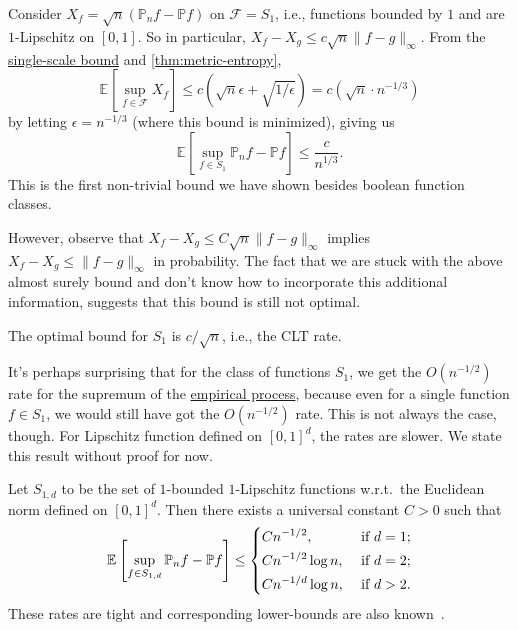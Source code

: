 \begin{eg}\label{eg:non-optimal-EP-supremum-S1}
	Consider \(X_f = \sqrt{n} (\mathbb{P} _n f - \mathbb{P} f)\) on \(\mathscr{F} = S_1\), i.e., functions bounded by \(1\) and are \(1\)-Lipschitz on \([0, 1]\). So in particular, \(X_f - X_g \leq c \sqrt{n} \lVert f - g \rVert _\infty\). From the \hyperref[lma:single-scale-bound]{single-scale bound} and \autoref{thm:metric-entropy},
	\[
		\mathbb{E}_{}\left[\sup _{f\in \mathscr{F} } X_f \right]
		\leq c \left(\sqrt{n} \epsilon + \sqrt{1 / \epsilon } \right)
		= c(\sqrt{n} \cdot n^{-1 / 3})
	\]
	by letting \(\epsilon = n^{-1 / 3}\) (where this bound is minimized), giving us
	\[
		\mathbb{E}_{}\left[\sup _{f\in S_1}\mathbb{P} _n f - \mathbb{P} f \right] \leq \frac{c}{n^{1 / 3}}.
	\]
	This is the first non-trivial bound we have shown besides boolean function classes.

	However, observe that \(X_f - X_g \leq C \sqrt{n} \lVert f - g \rVert _\infty \) implies \(X_f - X_g \leq \lVert f - g \rVert _\infty \) in probability. The fact that we are stuck with the above almost surely bound and don't know how to incorporate this additional information, suggests that this bound is still not optimal.
	\begin{remark}
		The optimal bound for \(S_1\) is \(c / \sqrt{n} \), i.e., the CLT rate.
	\end{remark}
\end{eg}

It's perhaps surprising that for the class of functions \(S_1\), we get the \(O(n^{-1 / 2})\) rate for the supremum of the \hyperref[def:EP]{empirical process}, because even for a single function \(f\in S_1\), we would still have got the \(O(n^{-1 / 2})\) rate. This is not always the case, though. For Lipschitz function defined on \([0, 1]^d\), the rates are slower. We state this result without proof for now.

\begin{lemma}\label{lma:lec11}
	Let \(S_{1, d}\) to be the set of \(1\)-bounded \(1\)-Lipschitz functions w.r.t.\ the Euclidean norm defined on \([0, 1]^d\). Then there exists a universal constant \(C > 0\) such that
	\[
		\mathbb{E}_{}\left[\sup _{f\in S_{1, d}} \mathbb{P} _n f - \mathbb{P} f\right]
		\leq \begin{dcases}
			C n^{-1 / 2},       & \text{ if } d = 1 ; \\
			Cn^{-1 / 2} \log n, & \text{ if } d = 2 ; \\
			Cn^{-1 / d} \log n, & \text{ if } d > 2 . \\
		\end{dcases}
	\]
	These rates are tight and corresponding lower-bounds are also known~\cite[Problem 5.11 (d)]{noauthororeditor}.
\end{lemma}